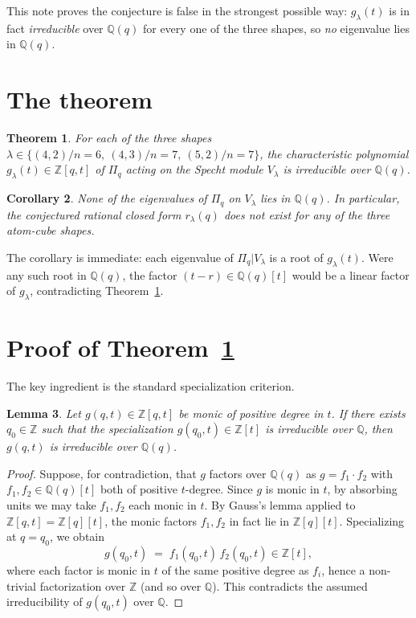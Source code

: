 \documentclass[11pt]{article}
\newtheorem{theorem}{Theorem}
\newtheorem{lemma}[theorem]{Lemma}
\newtheorem{corollary}[theorem]{Corollary}
\theoremstyle{remark}
\begin{document}
This note proves the conjecture is false in the strongest possible way:
$g_\lambda(t)$ is in fact \emph{irreducible} over $\mathbb{Q}(q)$ for every
one of the three shapes, so \emph{no} eigenvalue lies in $\mathbb{Q}(q)$.

\section{The theorem}

\begin{theorem}\label{thm:irr}
For each of the three shapes
$\lambda \in \{(4,2)/n=6,\ (4,3)/n=7,\ (5,2)/n=7\}$,
the characteristic polynomial $g_\lambda(t) \in \mathbb{Z}[q,t]$ of
$\Pi_q$ acting on the Specht module $V_\lambda$ is \emph{irreducible}
over $\mathbb{Q}(q)$.
\end{theorem}

\begin{corollary}\label{cor:no-rational}
None of the eigenvalues of $\Pi_q$ on $V_\lambda$ lies in $\mathbb{Q}(q)$.
In particular, the conjectured rational closed form $r_\lambda(q)$ does
not exist for any of the three atom-cube shapes.
\end{corollary}

The corollary is immediate: each eigenvalue of $\Pi_q | V_\lambda$ is a
root of $g_\lambda(t)$. Were any such root in $\mathbb{Q}(q)$, the
factor $(t - r) \in \mathbb{Q}(q)[t]$ would be a linear factor of
$g_\lambda$, contradicting Theorem~\ref{thm:irr}.

\section{Proof of Theorem~\ref{thm:irr}}

The key ingredient is the standard specialization criterion.

\begin{lemma}\label{lem:spec}
Let $g(q,t) \in \mathbb{Z}[q,t]$ be monic of positive degree in $t$.
If there exists $q_0 \in \mathbb{Z}$ such that the specialization
$g(q_0, t) \in \mathbb{Z}[t]$ is irreducible over $\mathbb{Q}$, then
$g(q,t)$ is irreducible over $\mathbb{Q}(q)$.
\end{lemma}

\begin{proof}
Suppose, for contradiction, that $g$ factors over $\mathbb{Q}(q)$ as
$g = f_1 \cdot f_2$ with $f_1, f_2 \in \mathbb{Q}(q)[t]$ both of positive
$t$-degree. Since $g$ is monic in $t$, by absorbing units we may take
$f_1, f_2$ each monic in $t$. By Gauss's lemma applied to
$\mathbb{Z}[q,t] = \mathbb{Z}[q][t]$, the monic factors $f_1, f_2$ in
fact lie in $\mathbb{Z}[q][t]$. Specializing at $q = q_0$, we obtain
\[
g(q_0, t) \;=\; f_1(q_0,t)\,f_2(q_0,t) \in \mathbb{Z}[t],
\]
where each factor is monic in $t$ of the same positive degree as $f_i$,
hence a non-trivial factorization over $\mathbb{Z}$ (and so over
$\mathbb{Q}$). This contradicts the assumed irreducibility of
$g(q_0, t)$ over $\mathbb{Q}$.
\end{proof}
\end{document}
